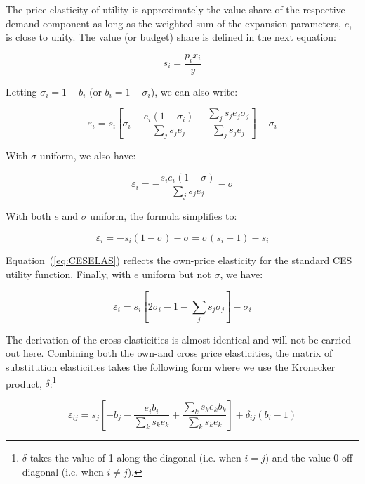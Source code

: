 \noindent The price elasticity of utility is approximately the value share of the respective demand
component as long as the weighted sum of the expansion parameters, $e$, is close to unity.
The value (or budget) share is defined in the next equation:

\begin{equation}
s_i = \frac{p_i x_i}{y}
\end{equation}

\noindent Letting $\sigma_i = 1-b_i$ (or $b_i = 1-\sigma_i$), we can also write:

\begin{equation}
{\varepsilon_i} = {s_i}\left[ {{\sigma_i} - \frac{{{e_i}(1 - {\sigma_i})}}
{{\sum\limits_j {{s_j}{e_j}} }} - \frac{{\sum\limits_j {{s_j}{e_j}{\sigma_j}} }}
{{\sum\limits_j {{s_j}{e_j}} }}} \right] - {\sigma_i}
\end{equation}

\noindent With $\sigma$ uniform, we also have:

\begin{equation}
{\varepsilon_i} =  - \frac{{{s_i}{e_i}(1 - \sigma )}}{{\sum\limits_j {{s_j}{e_j}} }} - \sigma
\end{equation}

\noindent With both $e$ and $\sigma$ uniform, the formula simplifies to:

\begin{equation}
\label{eq:CESELAS}
{\varepsilon_i} =  - {s_i}(1 - \sigma ) - \sigma  = \sigma ({s_i} - 1) - {s_i}
\end{equation}

\noindent Equation~(\ref{eq:CESELAS}) reflects the own-price elasticity for the standard CES
utility function. Finally, with $e$ uniform but not $\sigma$, we have:

\begin{equation}
{\varepsilon_i} = {s_i}\left[ {2{\sigma_i} - 1 - \sum\limits_j {{s_j}{\sigma_j}} } \right]
- {\sigma_i}
\end{equation}

The derivation of the cross elasticities is almost identical and will not be carried out here.
Combining both the own-and cross price elasticities, the matrix of substitution elasticities
takes the following form where we use the Kronecker product, $\delta$:\footnote{$\delta$ takes
the value of 1 along the diagonal (i.e. when $i=j$) and the value 0 off-diagonal
(i.e. when $i \ne j$).}

\begin{equation}
{\varepsilon_{ij}} = {s_j}\left[ { - {b_j} - \frac{{{e_i}{b_i}}}{{\sum\limits_k {{s_k}{e_k}} }}
+ \frac{{\sum\limits_k {{s_k}{e_k}{b_k}} }}{{\sum\limits_k {{s_k}{e_k}} }}} \right]
+ {\delta_{ij}}({b_i} - 1)
\end{equation}

